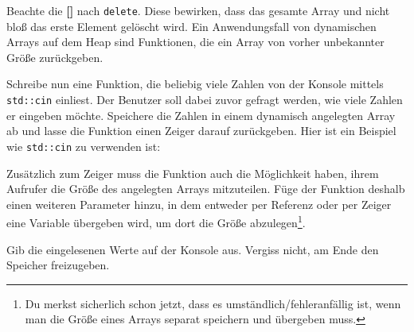 
Beachte die \textbf{[]} nach \lstinline{delete}.
Diese bewirken, dass das gesamte Array und nicht bloß das erste Element gelöscht wird.
Ein Anwendungsfall von dynamischen Arrays auf dem Heap sind Funktionen, die ein Array von vorher unbekannter Größe zurückgeben.

Schreibe nun eine Funktion, die beliebig viele Zahlen von der Konsole mittels \lstinline{std::cin} einliest.
Der Benutzer soll dabei zuvor gefragt werden, wie viele Zahlen er eingeben möchte.
Speichere die Zahlen in einem dynamisch angelegten Array ab und lasse die Funktion einen Zeiger darauf zurückgeben.
Hier ist ein Beispiel wie \lstinline{std::cin} zu verwenden ist:


Zusätzlich zum Zeiger muss die Funktion auch die Möglichkeit haben, ihrem Aufrufer die Größe des angelegten Arrays mitzuteilen.
Füge der Funktion deshalb einen weiteren Parameter hinzu, in dem entweder per Referenz oder per Zeiger eine Variable übergeben wird, um dort die Größe abzulegen\footnote{Du merkst sicherlich schon jetzt, dass es umständlich/fehleranfällig ist, wenn man die Größe eines Arrays separat speichern und übergeben muss.}.

Gib die eingelesenen Werte auf der Konsole aus.
Vergiss nicht, am Ende den Speicher freizugeben.

